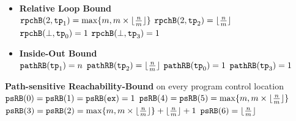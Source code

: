 \begin{enumerate}
{\begin{itemize}
  \\
  $\lpch(\tpath_0) = \tpath_0$ \qquad
  $\lpch(\tpath_1) = 2\to \tpath_1$ \\
  $\lpch(\tpath_3) = \tpath_3$ \qquad
  $\lpch(\tpath_2) = 2\to \tpath_2$ 
  \item \textbf{{Relative Loop Bound}}
  \\
  $\mathtt{rpchB}(2, \mathtt{tp}_1) = \max\{m, m \times \lfloor\frac{n}{m}\rfloor\}$ \quad
  $\mathtt{rpchB}(2, \mathtt{tp}_2) = \lfloor\frac{n}{m}\rfloor$  \\
  $\mathtt{rpchB}(\bot, \mathtt{tp}_0) = 1$ \quad
  $\mathtt{rpchB}(\bot, \mathtt{tp}_3) = 1$ 
  \item \textbf{Inside-Out Bound}
  \\
  $\mathtt{pathRB}(\mathtt{tp}_1) = n$ \quad
  $\mathtt{pathRB}(\mathtt{tp}_2) = \lfloor\frac{n}{m}\rfloor$ \quad
  $\mathtt{pathRB}(\mathtt{tp}_0) = 1$ \quad
  $\mathtt{pathRB}(\mathtt{tp}_3) = 1$ 
\end{itemize}
\item \textbf{Path-sensitive Reachability-Bound} on every program control location
\\
$\mathtt{psRB}(0) = \mathtt{psRB}(1) = \mathtt{psRB}(\mathtt{ex}) = 1$ \qquad
$\mathtt{psRB}(4) = \mathtt{psRB}(5) = \max\{m, m \times \lfloor\frac{n}{m}\rfloor\}$ 
\\
$\mathtt{psRB}(3) = \mathtt{psRB}(2) = \max\{m, m \times \lfloor\frac{n}{m}\rfloor\} + \lfloor\frac{n}{m}\rfloor + 1 $
\quad $\mathtt{psRB}(6) = \lfloor\frac{n}{m}\rfloor$ 
} 
\end{enumerate}